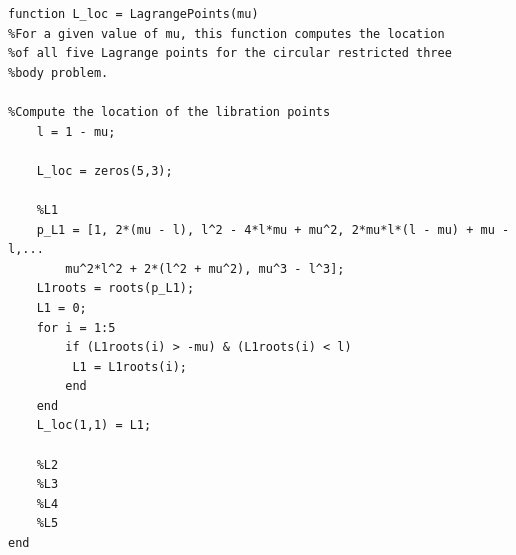 \begin{lstlisting}
function L_loc = LagrangePoints(mu)
%For a given value of mu, this function computes the location
%of all five Lagrange points for the circular restricted three
%body problem.

%Compute the location of the libration points
    l = 1 - mu;

    L_loc = zeros(5,3);

    %L1
    p_L1 = [1, 2*(mu - l), l^2 - 4*l*mu + mu^2, 2*mu*l*(l - mu) + mu - l,...
        mu^2*l^2 + 2*(l^2 + mu^2), mu^3 - l^3];
    L1roots = roots(p_L1);
    L1 = 0;
    for i = 1:5
        if (L1roots(i) > -mu) & (L1roots(i) < l)
         L1 = L1roots(i);
        end
    end
    L_loc(1,1) = L1;

    %L2
    %L3
    %L4
    %L5
end
\end{lstlisting}